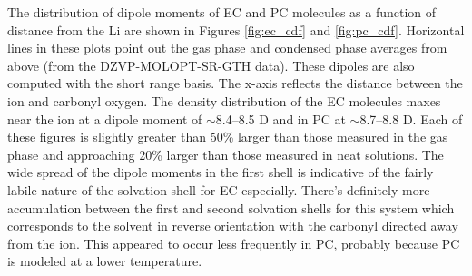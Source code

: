 \begin{ecpc}
   The distribution of dipole moments of EC and PC molecules as a function of distance from the Li\sur{+} are shown in Figures \ref{fig:ec_cdf} and \ref{fig:pc_cdf}. 
   Horizontal lines in these plots point out the gas phase and condensed phase averages from above (from the DZVP-MOLOPT-SR-GTH data). These dipoles are also computed 
   with the short range basis. The x-axis reflects the distance between the ion and carbonyl oxygen. The density distribution of the EC molecules maxes near the ion
   at a dipole moment of $\sim$8.4--8.5 D and in PC at $\sim$8.7--8.8 D. Each of these figures is slightly greater than 50\% larger than those measured in the gas 
   phase and approaching 20\% larger than those measured in neat solutions. The wide spread of the dipole moments in the first shell is indicative of the fairly 
   labile nature of the solvation shell for EC especially. There's definitely more accumulation between the first and second solvation shells for this system which
   corresponds to the solvent in reverse orientation with the carbonyl directed away from the ion. This appeared to occur less frequently in PC, probably because 
   PC is modeled at a lower temperature.


\end{ecpc}
